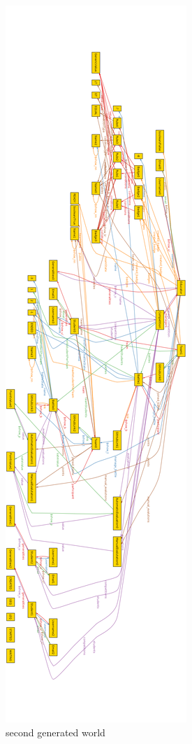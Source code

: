 \begin{figure}[H]
    \centering
    \includegraphics[height=\textheight]{Images/alloy/alloy_gen_02.png}
    \caption{second generated world}
\end{figure}
